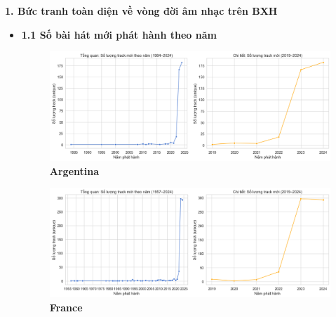 \textbf{1. Bức tranh toàn diện về vòng đời âm nhạc trên BXH}
\begin{itemize}
    \item \textbf{1.1 Số bài hát mới phát hành theo năm}


    \begin{figure}[H]
        \centering
        \begin{minipage}{0.45\textwidth}
            \centering
            \includegraphics[width=\linewidth]{../graphics/data_top50/figure/10/EDA_argentina.png}
            \\[4pt] {\small \textbf{Argentina}}
        \end{minipage}
        \hfill
        \begin{minipage}{0.45\textwidth}
            \centering
            \includegraphics[width=\linewidth]{../graphics/data_top50/figure/10/EDA_france.png}
            \\[4pt] {\small \textbf{France}}
        \end{minipage}

        \vspace{0.4cm}


\end{figure}
\end{itemize}

